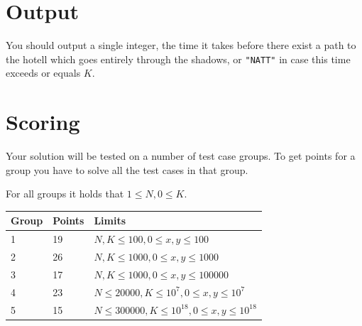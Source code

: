 \section*{Output}
You should output a single integer, the time it takes before there exist a path to the hotell which goes entirely through the shadows, or \texttt{"NATT"} in case this time exceeds or equals $K$.

\section*{Scoring}
Your solution will be tested on a number of test case groups. To get points for a group
you have to solve all the test cases in that group.

For all groups it holds that $1 \le N, 0 \le K$.

\begin{tabular}{| l | l | l |}
	\hline
	Group & Points & Limits\\ \hline
	1 & 19 & $N, K \le 100, 0 \le x, y \le 100$ \\ \hline
	2 & 26 & $N, K \le 1000, 0 \le x, y \le 1000$ \\ \hline
	3 & 17 & $N, K \le 1000, 0 \le x, y \le 100000$ \\ \hline
	4 & 23 & $N \le 20000, K \le 10^7, 0 \le x, y \le 10^7$ \\ \hline
	5 & 15 & $N \le 300000, K \le 10^{18}, 0 \le x, y \le 10^{18}$ \\ \hline
\end{tabular}
